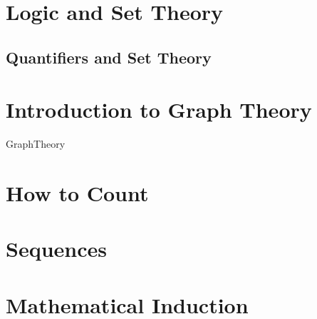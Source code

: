 \documentclass[12pt, oneside]{book}
\begin{document}




%


\chapter[Logic]{Logic and Set Theory}


%
\section*{Quantifiers and Set Theory}


%

\chapter[Graph Theory]{Introduction to Graph Theory}

{GraphTheory}


\chapter[Counting]{How to Count}


%


%


%


\chapter[Sequences]{Sequences}


%


%


\chapter[Induction]{Mathematical Induction}
\end{document}
